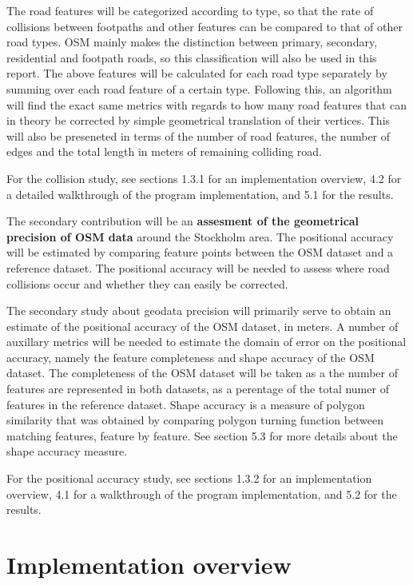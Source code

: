 \documentclass{kththesis}
\begin{document}
The road features will be categorized according to type, so that the rate of collisions between footpaths and other features can be compared to that of other road types.
OSM mainly makes the distinction between primary, secondary, residential and footpath roads, so this classification will also be used in this report.
The above features will be calculated for each road type separately by summing over each road feature of a certain type.
Following this, an algorithm will find the exact same metrics with regards to how many road features that can in theory be corrected by simple geometrical translation of their vertices.
This will also be preseneted in terms of the number of road features, the number of edges and the total length in meters of remaining colliding road.

For the collision study, see sections 1.3.1 for an implementation overview, 4.2 for a detailed walkthrough of the program implementation, and 5.1 for the results.

The secondary contribution will be an \textbf{assesment of the geometrical precision of OSM data} around the Stockholm area.
The positional accuracy will be estimated by comparing feature points between the OSM dataset and a reference dataset.
The positional accuracy will be needed to assess where road collisions occur and whether they can easily be corrected.

The secondary study about geodata precision will primarily serve to obtain an estimate of the positional accuracy of the OSM dataset, in meters.
A number of auxillary metrics will be needed to estimate the domain of error on the positional accuracy, namely the feature completeness and shape accuracy of the OSM dataset.
The completeness of the OSM dataset will be taken as a the number of features are represented in both datasets, as a perentage of the total numer of features in the reference dataset.
Shape accuracy is a measure of polygon similarity that was obtained by comparing polygon turning function between matching features, feature by feature.
See section 5.3 for more details about the shape accuracy measure.

For the positional accuracy study, see sections 1.3.2 for an implementation overview, 4.1 for a walkthrough of the program implementation, and 5.2 for the results.

\section{Implementation overview}
\end{document}
